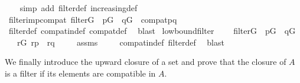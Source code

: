 \begin{isabellebody}
%
\isadelimproof
\ \ %
\endisadelimproof
%
\isatagproof
{}\isamarkupfalse%
\ {\isacharparenleft}{\kern0pt}simp\ add{\isacharcolon}{\kern0pt}\ filter{\isacharunderscore}{\kern0pt}def\ increasing{\isacharunderscore}{\kern0pt}def{\isacharparenright}{\kern0pt}%
\endisatagproof
{\isafoldproof}%
%
\isadelimproof
\isanewline
%
\endisadelimproof
\isanewline
{}\isamarkupfalse%
\ filter{\isacharunderscore}{\kern0pt}imp{\isacharunderscore}{\kern0pt}compat{\isacharcolon}{\kern0pt}\ {\isachardoublequoteopen}filter{\isacharparenleft}{\kern0pt}G{\isacharparenright}{\kern0pt}\ {\isasymLongrightarrow}\ p{\isasymin}G\ {\isasymLongrightarrow}\ q{\isasymin}G\ {\isasymLongrightarrow}\ compat{\isacharparenleft}{\kern0pt}p{\isacharcomma}{\kern0pt}q{\isacharparenright}{\kern0pt}{\isachardoublequoteclose}\isanewline
%
\isadelimproof
\ \ %
\endisadelimproof
%
\isatagproof
{}\isamarkupfalse%
\ filter{\isacharunderscore}{\kern0pt}def\ compat{\isacharunderscore}{\kern0pt}in{\isacharunderscore}{\kern0pt}def\ compat{\isacharunderscore}{\kern0pt}def\ \isamarkupfalse%
\ blast%
\endisatagproof
{\isafoldproof}%
%
\isadelimproof
\isanewline
%
\endisadelimproof
\isanewline
{}\isamarkupfalse%
\ low{\isacharunderscore}{\kern0pt}bound{\isacharunderscore}{\kern0pt}filter{\isacharcolon}{\kern0pt}\ %
\isanewline
\ \ \ {\isachardoublequoteopen}filter{\isacharparenleft}{\kern0pt}G{\isacharparenright}{\kern0pt}{\isachardoublequoteclose}\ \ {\isachardoublequoteopen}p{\isasymin}G{\isachardoublequoteclose}\ \ {\isachardoublequoteopen}q{\isasymin}G{\isachardoublequoteclose}\isanewline
\ \ \ {\isachardoublequoteopen}{\isasymexists}r{\isasymin}G{\isachardot}{\kern0pt}\ r{\isasympreceq}p\ {\isasymand}\ r{\isasympreceq}q{\isachardoublequoteclose}\ \isanewline
%
\isadelimproof
\ \ %
\endisadelimproof
%
\isatagproof
{}\isamarkupfalse%
\ assms\ \isanewline
\ \ \isamarkupfalse%
\ compat{\isacharunderscore}{\kern0pt}in{\isacharunderscore}{\kern0pt}def\ filter{\isacharunderscore}{\kern0pt}def\ \isamarkupfalse%
\ blast%
\endisatagproof
{\isafoldproof}%
%
\isadelimproof
%
\endisadelimproof
%
\begin{isamarkuptext}%
We finally introduce the upward closure of a set
and prove that the closure of $A$ is a filter if its elements are
compatible in $A$.%
\end{isamarkuptext}\isamarkuptrue%

\end{isabellebody}
